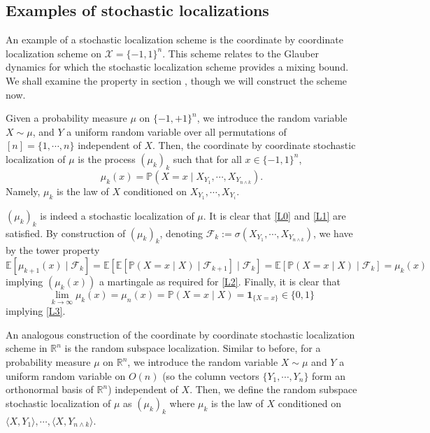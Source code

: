 \subsection{Examples of stochastic localizations}

An example of a stochastic localization scheme is the coordinate by coordinate localization scheme 
on \(\mathcal{X} = \{-1, 1\}^n\). This scheme relates to the Glauber dynamics for which the stochastic 
localization scheme provides a mixing bound. We shall examine the property in section , 
though we will construct the scheme now. 

Given a probability measure \(\mu\) on \(\{-1, +1\}^n\), we introduce the random variable \(X \sim \mu\), and 
\(Y\) a uniform random variable over all permutations of \([n] = \{1, \cdots, n\}\) independent of \(X\). 
Then, the coordinate by coordinate stochastic localization of \(\mu\) is the process \((\mu_k)_{k}\)
such that for all \(x \in \{-1, 1\}^n\),
\[\mu_k(x) = \mathbb{P}(X = x \mid X_{Y_1}, \cdots, X_{Y_{n \wedge k}}).\]
Namely, \(\mu_k\) is the law of \(X\) conditioned on \(X_{Y_1}, \cdots, X_{Y_i}\).

\((\mu_k)_{k}\) is indeed a stochastic localization of \(\mu\). It is clear that \ref{L0} and \ref{L1} are 
satisfied. By construction of \((\mu_k)_k\), denoting 
\(\mathscr{F}_k := \sigma(X_{Y_1}, \cdots, X_{Y_{n \wedge k}})\), we have by the tower property
\[\mathbb{E}[\mu_{k + 1}(x) \mid \mathscr{F}_k] 
  = \mathbb{E}[\mathbb{E}[\mathbb{P}(X = x \mid X) \mid \mathscr{F}_{k + 1}] \mid \mathscr{F}_k]
  = \mathbb{E}[\mathbb{P}(X = x \mid X) \mid \mathscr{F}_k] = \mu_k(x)\]
implying \((\mu_k(x))\) a martingale as required for \ref{L2}. Finally, it is clear that
\[\lim_{k \to \infty} \mu_k(x) = \mu_n(x) = \mathbb{P}(X = x \mid X) = \mathbf{1}_{\{X = x\}} \in \{0, 1\}\]
implying \ref{L3}.

An analogous construction of the coordinate by coordinate stochastic localization scheme in \(\mathbb{R}^n\) 
is the random subspace localization. Similar to before, for a probability measure \(\mu\) on \(\mathbb{R}^n\),
we introduce the random variable \(X \sim \mu\) and \(Y\) a uniform random variable on \(O(n)\) 
(so the column vectors \(\{Y_1, \cdots, Y_n\}\) form an orthonormal basis of \(\mathbb{R}^n\)) 
independent of \(X\). Then, we define the random subspace stochastic localization of \(\mu\) as \((\mu_k)_k\) 
where \(\mu_k\) is the law of \(X\) conditioned on \(\langle X, Y_1\rangle, \cdots, \langle X, Y_{n \wedge k}\rangle\).


